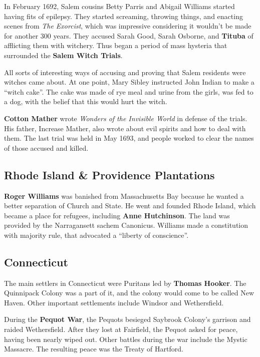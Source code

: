 In February 1692, Salem cousins Betty Parris and Abigail Williams started having fits of epilepsy.
They started screaming, throwing things, and enacting scenes from \textit{The Exorcist},
which was impressive considering it wouldn't be made for another 300 years.
They accused Sarah Good, Sarah Osborne, and \textbf{Tituba} of afflicting them with witchery.
Thus began a period of mass hysteria that surrounded the \textbf{Salem Witch Trials}.

All sorts of interesting ways of accusing and proving that Salem residents were witches came about.
At one point, Mary Sibley instructed John Indian to make a ``witch cake''.
The cake was made of rye meal and urine from the girls, was fed to a dog,
with the belief that this would hurt the witch.

\textbf{Cotton Mather} wrote \textit{Wonders of the Invisible World} in defense of the trials.
His father, Increase Mather, also wrote about evil spirits and how to deal with them.
The last trial was held in May 1693, and people worked to clear the names of those accused and killed.

\subsection*{Rhode Island \& Providence Plantations}

\textbf{Roger Williams} was banished from Massachusetts Bay because he wanted a better separation of Church and State.
He went and founded Rhode Island, which became a place for refugees, including \textbf{Anne Hutchinson}.
The land was provided by the Narragansett sachem Canonicus.
Williams made a constitution with majority rule, that advocated a ``liberty of conscience''.

\subsection*{Connecticut}

The main settlers in Connecticut were Puritans led by \textbf{Thomas Hooker}.
The Quinnipack Colony was a part of it, and the colony would come to be called New Haven.
Other important settlements include Windsor and Wethersfield.

During the \textbf{Pequot War}, the Pequots besieged Saybrook Colony's garrison and raided Wethersfield.
After they lost at Fairfield, the Pequot asked for peace, having been nearly wiped out.
Other battles during the war include the Mystic Massacre.
The resulting peace was the Treaty of Hartford.

